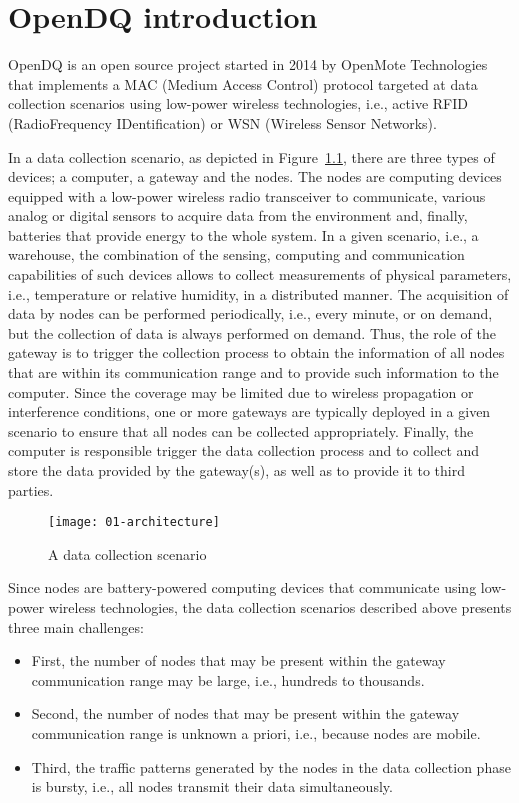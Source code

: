 \chapter{OpenDQ introduction}
\label{sec:01-introduction}
OpenDQ is an open source project started in 2014 by OpenMote Technologies that implements a MAC (Medium Access Control) protocol targeted at data collection scenarios using low-power wireless technologies, i.e., active RFID (RadioFrequency IDentification) or WSN (Wireless Sensor Networks).

In a data collection scenario, as depicted in Figure~\ref{fig:01-architecture}, there are three types of devices; a computer, a gateway and the nodes. The nodes are computing devices equipped with a low-power wireless radio transceiver to communicate, various analog or digital sensors to acquire data from the environment and, finally, batteries that provide energy to the whole system. In a given scenario, i.e., a warehouse, the combination of the sensing, computing and communication capabilities of such devices allows to collect measurements of physical parameters, i.e., temperature or relative humidity, in a distributed manner. The acquisition of data by nodes can be performed periodically, i.e., every minute, or on demand, but the collection of data is always performed on demand. Thus, the role of the gateway is to trigger the collection process to obtain the information of all nodes that are within its communication range and to provide such information to the computer. Since the coverage may be limited due to wireless propagation or interference conditions, one or more gateways are typically deployed in a given scenario to ensure that all nodes can be collected appropriately. Finally, the computer is responsible trigger the data collection process and to collect and store the data provided by the gateway(s), as well as to provide it to third parties.

\begin{figure}[!t]
    \centering
	\texttt{[image: 01-architecture]}
    \caption{A data collection scenario}
    \label{fig:01-architecture}
\end{figure}

Since nodes are battery-powered computing devices that communicate using low-power wireless technologies, the data collection scenarios described above presents three main challenges:
\begin{itemize}
\item First, the number of nodes that may be present within the gateway communication range may be large, i.e., hundreds to thousands.
\item Second, the number of nodes that may be present within the gateway communication range is unknown a priori, i.e., because nodes are mobile.
\item Third, the traffic patterns generated by the nodes in the data collection phase is bursty, i.e., all nodes transmit their data simultaneously.
\end{itemize}

